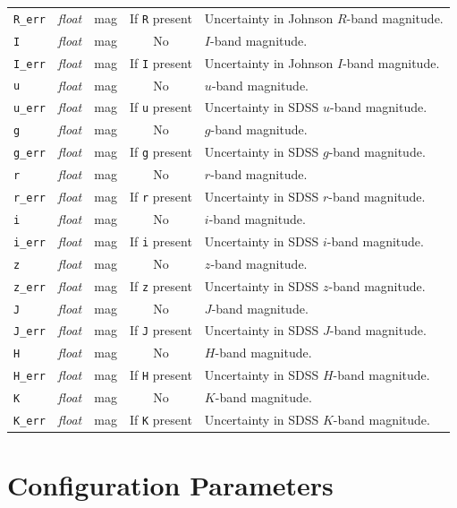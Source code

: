 \documentclass{report}
\begin{document}
\begin{center}
\begin{longtable}{lllcp{2in}}
\verb|R_err| & {\it float} & mag & If \verb|R| present & Uncertainty in Johnson $R$-band magnitude. \\
\verb|I| & {\it float} & mag & No & $I$-band magnitude. \\
\verb|I_err| & {\it float} & mag & If \verb|I| present & Uncertainty in Johnson $I$-band magnitude. \\
\verb|u| & {\it float} & mag & No & $u$-band magnitude. \\
\verb|u_err| & {\it float} & mag & If \verb|u| present & Uncertainty in SDSS $u$-band magnitude. \\
\verb|g| & {\it float} & mag & No & $g$-band magnitude. \\
\verb|g_err| & {\it float} & mag & If \verb|g| present & Uncertainty in SDSS $g$-band magnitude. \\
\verb|r| & {\it float} & mag & No & $r$-band magnitude. \\
\verb|r_err| & {\it float} & mag & If \verb|r| present & Uncertainty in SDSS $r$-band magnitude. \\
\verb|i| & {\it float} & mag & No & $i$-band magnitude. \\
\verb|i_err| & {\it float} & mag & If \verb|i| present & Uncertainty in SDSS $i$-band magnitude. \\
\verb|z| & {\it float} & mag & No & $z$-band magnitude. \\
\verb|z_err| & {\it float} & mag & If \verb|z| present & Uncertainty in SDSS $z$-band magnitude. \\
\verb|J| & {\it float} & mag & No & $J$-band magnitude. \\
\verb|J_err| & {\it float} & mag & If \verb|J| present & Uncertainty in SDSS $J$-band magnitude. \\
\verb|H| & {\it float} & mag & No & $H$-band magnitude. \\
\verb|H_err| & {\it float} & mag & If \verb|H| present & Uncertainty in SDSS $H$-band magnitude. \\
\verb|K| & {\it float} & mag & No & $K$-band magnitude. \\
\verb|K_err| & {\it float} & mag & If \verb|K| present & Uncertainty in SDSS $K$-band magnitude. \\
\end{longtable}
\end{center}


\chapter{Configuration Parameters}
\label{sec:config}
\end{document}
